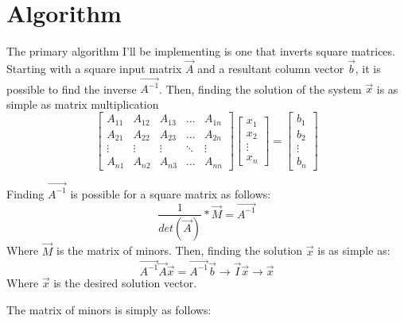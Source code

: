 \documentclass[12pt]{article}
\begin{document}
\section{Algorithm}
The primary algorithm I'll be implementing is one that inverts square matrices. Starting with a square input matrix $\vec{A}$ and a resultant column vector $\vec{b}$, it is possible to find the inverse $\vec{A^{-1}}$. Then, finding the solution of the system $\vec{x}$ is as simple as matrix multiplication
\begin{equation}
\begin{bmatrix}
A_{11} & A_{12} & A_{13} & \dots & A_{1n} \\
	A_{21} & A_{22} & A_{23} & \dots & A_{2n} \\
	\vdots & \vdots & \vdots & \ddots & \vdots \\
	A_{n1} & A_{n2} & A_{n3} & \dots & A_{nn}
\end{bmatrix} 
\begin{bmatrix}
x_{1} \\
x_{2} \\
\vdots \\
x_{n}
\end{bmatrix}
=
\begin{bmatrix}
b_{1} \\
b_{2} \\
\vdots \\
b_{n}
\end{bmatrix}
\end{equation}

Finding $\vec{A^{-1}}$ is possible for a square matrix as follows:
\begin{equation}
\frac{1}{det(\vec{A})} * \vec{M} = \vec{A^{-1}}
\end{equation}
Where $\vec{M}$ is the matrix of minors. Then, finding the solution $\vec{x}$ is as simple as:
\begin{equation}
\vec{A^{-1}} \vec{A} \vec{x} = \vec{A^{-1}} \vec{b} \rightarrow \vec{I} \vec{x} \rightarrow \vec{x}
\end{equation}
Where $\vec{x}$ is the desired solution vector.

The matrix of minors is simply as follows:
\end{document}

